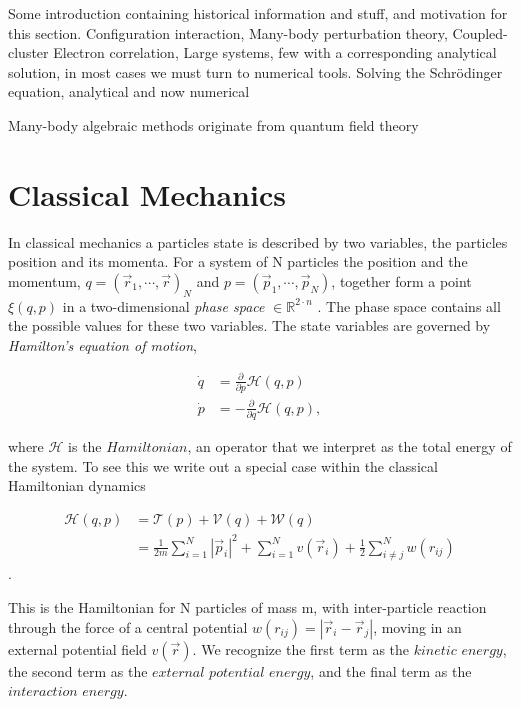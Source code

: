 Some introduction containing historical information and stuff, and motivation for this section. 
Configuration interaction, Many-body perturbation theory, Coupled-cluster 
Electron correlation,
Large systems, few with a corresponding analytical solution, in most cases we must turn to numerical tools. 
Solving the Schrödinger equation, analytical and now numerical

Many-body algebraic methods originate from quantum field theory \cite{shavitt2009many}

\section{Classical Mechanics}

In classical mechanics a particles state is described by two variables, the particles position and its momenta. For a system of N particles the position and the momentum, $q = (\vec{r}_1, \cdots,\vec{r})_N$ and $p = (\vec{p}_1, \cdots,\vec{p}_N)$, together form a point $\xi(q, p)$ in a two-dimensional \textit{phase space} $\in \mathbb{R}^{2 \cdot n}$ \cite{kvaal}. The phase space contains all the possible values for these two variables.
The state variables are governed by \textit{Hamilton's equation of motion},

\begin{align}
\dot{q} &= \frac{\partial}{\partial p} \mathscr{H} (q, p) \\
\dot{p} &= -\frac{\partial}{\partial q} \mathscr{H} (q, p),
\end{align}

where $\mathscr{H}$ is the $\textit{Hamiltonian}$, an operator that we interpret as the total energy of the system. To see this we write out a special case within the classical Hamiltonian dynamics

\begin{align}
\mathscr{H}(q,p) &= \mathscr{T}(p) + \mathscr{V}(q) + \mathscr{W}(q) \\
&= \frac{1}{2m} \sum^N_{i=1} |\vec{p}_i|^2 + \sum^N_{i=1} v(\vec{r}_i) + \frac{1}{2} \sum^N_{i \neq j} w(r_{ij})
\end{align}.

This is the Hamiltonian for N particles of mass m, with inter-particle reaction through the force of a central potential $w(r_{ij}) = |\vec{r}_i - \vec{r}_j|$, moving in an external potential field $v(\vec{r})$. We recognize the first term as the $\textit{kinetic energy}$, the second term as the $\textit{external potential energy}$, and the final term as the $\textit{interaction energy}$.

